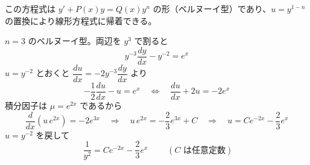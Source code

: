
この方程式は $y' + P(x)y = Q(x)y^{n}$ の形（ベルヌーイ型）であり、$u = y^{1-n}$ の置換により線形方程式に帰着できる。

$n = 3$ のベルヌーイ型。両辺を $y^{3}$ で割ると
\[
y^{-3}\frac{dy}{dx} - y^{-2} = e^{x}
\]
$u = y^{-2}$ とおくと $\dfrac{du}{dx} = -2y^{-3}\dfrac{dy}{dx}$ より
\[
-\frac{1}{2}\frac{du}{dx} - u = e^{x}
\quad\Longleftrightarrow\quad
\frac{du}{dx} + 2u = -2e^{x}
\]
積分因子は $\mu = e^{2x}$ であるから
\[
\frac{d}{dx}\left(u\,e^{2x}\right) = -2e^{3x}
\quad\Longrightarrow\quad
u\,e^{2x} = -\frac{2}{3}e^{3x} + C
\quad\Longrightarrow\quad
u = Ce^{-2x} - \frac{2}{3}e^{x}
\]
$u = y^{-2}$ を戻して
\[
\boxed{\; \frac{1}{y^{2}} = Ce^{-2x} - \frac{2}{3}e^{x} \;}
\qquad (C \text{ は任意定数})
\]

